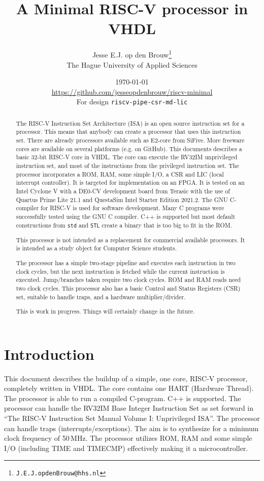 \documentclass[12pt]{article}
\author{Jesse E.J. op den Brouw\thanks{\texttt{J.E.J.opdenBrouw@hhs.nl}}\\[2ex]The Hague University of Applied Sciences}
\title{A Minimal RISC-V processor in VHDL}
\date{\today\\[2ex]\normalsize\url{https://github.com/jesseopdenbrouw/riscv-minimal}\\[2ex]For design \texttt{riscv-pipe-csr-md-lic}}
\begin{document}
\maketitle

\vfill
\begin{abstract}
\baselineskip
\noindent
The RISC-V Instruction Set Architecture (ISA) is an open source instruction set for a processor. This means that anybody can create a processor that uses this instruction set. There are already processors available such as E2-core from SiFive. More freeware cores are available on several platforms (e.g. on GitHub). This documents describes a basic 32-bit RISC-V core in VHDL. The core can execute the RV32IM unprivileged instruction set, and most of the instructions from the privileged instruction set. The processor incorporates a ROM, RAM, some simple I/O, a CSR and LIC (local interrupt controller). It is targeted for implementation on an FPGA. It is tested on an Intel Cyclone V with a DE0-CV development board from Terasic with the use of Quartus Prime Lite 21.1 and QuestaSim Intel Starter Edition 2021.2. The GNU C-compiler for RISC-V is used for software development. Many C programs were successfully tested using the GNU C compiler. C++ is supported but most default constructions from \texttt{std} and \texttt{STL} create a binary that is too big to fit in the ROM.

\noindent
This processor is not intended as a replacement for commercial available processors. It is intended as a study object for Computer Science students.

\noindent
The processor has a simple two-stage pipeline and executes each instruction in two clock cycles, but the next instruction is fetched while the current instruction is executed. Jump/branches taken require two clock cycles. ROM and RAM reads need two clock cycles. This processor also has a basic Control and Status Registers (CSR) set, suitable to handle traps, and a hardware multiplier/divider.

\noindent
This is work in progress. Things will certainly change in the future.
\end{abstract}
\vfill

\clearpage
\tableofcontents

\clearpage
\section{Introduction}
This document describes the buildup of a simple, one core, RISC-V processor, completely written in VHDL. The core contains one HART (Hardware Thread). The processor is able to run a compiled C-program. C++ is supported. The processor can handle the RV32IM Base Integer Instruction Set as set forward in ``The RISC-V Instruction Set Manual Volume I: Unprivileged ISA''. The processor can handle traps (interrupts/exceptions). The aim is to synthesize for a minimum clock frequency of 50\,MHz. The processor utilizes ROM, RAM and some simple I/O (including TIME and TIMECMP) effectively making it a microcontroller.
\end{document}
